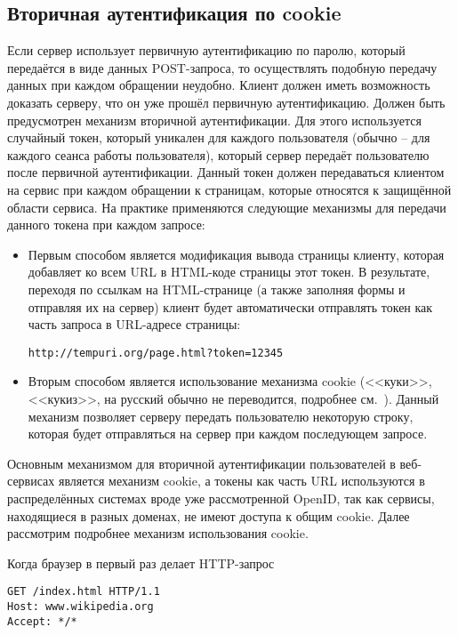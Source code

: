 \subsection{Вторичная аутентификация по cookie}

Если сервер использует первичную аутентификацию по паролю, который передаётся в виде данных POST-запроса, то осуществлять подобную передачу данных при каждом обращении неудобно. Клиент должен иметь возможность доказать серверу, что он уже прошёл первичную аутентификацию. Должен быть предусмотрен механизм вторичной аутентификации. Для этого используется случайный токен, который уникален для каждого пользователя (обычно -- для каждого сеанса работы пользователя), который сервер передаёт пользователю после первичной аутентификации. Данный токен должен передаваться клиентом на сервис при каждом обращении к страницам, которые относятся к защищённой области сервиса. На практике применяются следующие механизмы для передачи данного токена при каждом запросе:

\begin{itemize}
	\item Первым способом является модификация вывода страницы клиенту, которая добавляет ко всем URL в HTML-коде страницы этот токен. В результате, переходя по ссылкам на HTML-странице (а также заполняя формы и отправляя их на сервер) клиент будет автоматически отправлять токен как часть запроса в URL-адресе страницы:

\texttt{http://tempuri.org/page.html?token=12345}
	\item Вторым способом является использование механизма cookie (<<куки>>, <<кукиз>>, на русский обычно не переводится, подробнее см.~\cite[Client Identification and Cookies]{Totty:2002}). Данный механизм позволяет серверу передать пользователю некоторую строку, которая будет отправляться на сервер при каждом последующем запросе.
\end{itemize}

Основным механизмом для вторичной аутентификации пользователей в веб-сервисах является механизм cookie, а токены как часть URL используются в распределённых системах вроде уже рассмотренной OpenID, так как сервисы, находящиеся в разных доменах, не имеют доступа к общим cookie. Далее рассмотрим подробнее механизм использования cookie.

Когда браузер в первый раз делает HTTP-запрос
\begin{center} \begin{verbatim}
GET /index.html HTTP/1.1
Host: www.wikipedia.org
Accept: */*
\end{verbatim} \end{center}

